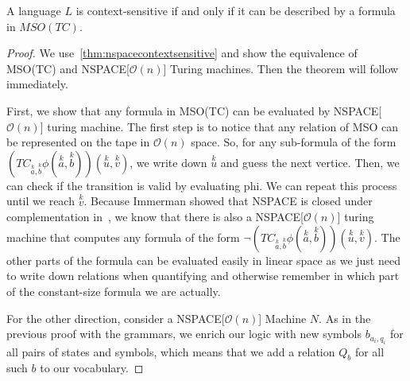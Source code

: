 \begin{theorem}\label{thm:contextsensitveMSOTC}
    A language $L$ is context-sensitive if and only if it can be described by a formula in $MSO(TC)$.
\end{theorem}

\begin{proof}
    We use~\cref{thm:nspacecontextsensitive} and show the equivalence of MSO(TC) and NSPACE[$\mathcal{O}(n)$] Turing machines.
    Then the theorem will follow immediately.

    First, we show that any formula in MSO(TC) can be evaluated by NSPACE[$\mathcal{O}(n)$] turing machine.
    The first step is to notice that any relation of MSO can be represented on the tape in $\mathcal{O}(n)$ space.
    So, for any sub-formula of the form $\left(TC_{\overset{k}{a}, \overset{k}{b}}\phi\left(\overset{k}{a}, \overset{k}{b}\right)\right)\left(\overset{k}{u}, \overset{k}{v}\right)$, we write down $\overset{k}{u}$ and guess the next vertice.
    Then, we can check if the transition is valid by evaluating phi.
    We can repeat this process until we reach $\overset{k}{v}$.
    Because Immerman showed that NSPACE is closed under complementation in~\cite{Immerman1988}, we know that there is also a NSPACE[$\mathcal{O}(n)$] turing machine that computes any formula of the form $\neg\left(TC_{\overset{k}{a}, \overset{k}{b}}\phi\left(\overset{k}{a}, \overset{k}{b}\right)\right)\left(\overset{k}{u}, \overset{k}{v}\right)$.
    The other parts of the formula can be evaluated easily in linear space as we just need to write down relations when quantifying and otherwise remember in which part of the constant-size formula we are actually.

    \vspace{5mm}

    For the other direction, consider a NSPACE[$\mathcal{O}(n)$] Machine $N$.
    As in the previous proof with the grammars, we enrich our logic with new symbols $b_{a_i, q_i}$ for all pairs of states and symbols, which means that we add a relation $Q_{b}$ for all such $b$ to our vocabulary.


\end{proof}
